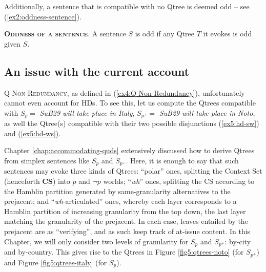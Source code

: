 Additionally, a sentence that is compatible with no Qtree is deemed odd -- see (\ref{ex2:oddness-sentence}).

\begin{exe}
	 {\textsc{\textbf{Oddness of a sentence}}. A sentence $S$ is odd if any Qtree $T$ it evokes is odd given $S$.}
\end{exe}


\subsection{An issue with the current account}

\textsc{Q-Non-Redundancy}, as defined in (\ref{ex4:Q-Non-Redundancy}), unfortunately cannot even account for HDs. To see this, let us compute the Qtrees compatible with $S_p = $ \textit{SuB29 will take place in Italy}, $S_{p^+} = $ \textit{SuB29 will take place in Noto}, as well the Qtree(s) compatible with their two possible disjunctions (\ref{ex5:hd-sw}) and (\ref{ex5:hd-ws}).

Chapter \ref{chap:accommodating-quds} extensively discussed how to derive Qtrees from simplex sentences like $S_p$ and $S_{p^+}$. Here, it is enough to say that such sentences may evoke three kinds of Qtrees: ``polar'' ones, splitting the Context Set (henceforth \textbf{CS}) into $p$ and $\neg p$ worlds; ``\textit{wh}'' ones, splitting the CS according to the Hamblin partition generated by same-granularity alternatives to the prejacent; and ``\textit{wh}-articulated'' ones, whereby each layer corresponds to a Hamblin partition of increasing granularity from the top down, the last layer matching the granularity of the prejacent. In each case, leaves entailed by the prejacent are \setlength{\fboxsep}{1pt} as ``verifying'', and as such keep track of at-issue content. In this Chapter, we will only consider two levels of granularity for $S_p$ and $S_{p^+}$: by-city and by-country. This gives rise to the Qtrees in Figure \ref{fig5:qtrees-noto} (for $S_{p^+}$) and Figure \ref{fig5:qtrees-italy} (for $S_{p}$). 

